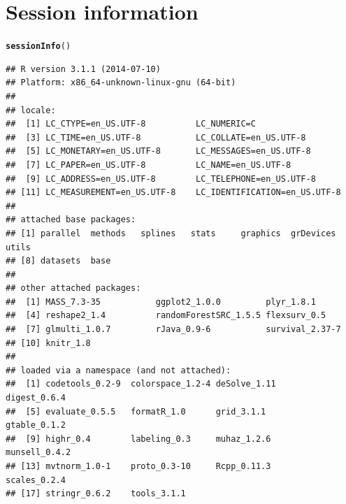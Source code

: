\documentclass{article}\usepackage[]{graphicx}\usepackage[]{color}
\makeatletter
\newcommand{\hlstd}[1]{\textcolor[rgb]{0.345,0.345,0.345}{#1}}%
\newcommand{\hlkwd}[1]{\textcolor[rgb]{0.737,0.353,0.396}{\textbf{#1}}}%
\newenvironment{kframe}{%
 \def\at@end@of@kframe{}%
 \ifinner\ifhmode%
  \def\at@end@of@kframe{\end{minipage}}%
  \begin{minipage}{\columnwidth}%
 \fi\fi%
 \def\FrameCommand##1{\hskip\@totalleftmargin \hskip-\fboxsep
 \colorbox{shadecolor}{##1}\hskip-\fboxsep
     \hskip-\linewidth \hskip-\@totalleftmargin \hskip\columnwidth}%
 \MakeFramed {\advance\hsize-\width
   \@totalleftmargin\z@ \linewidth\hsize
   \@setminipage}}%
 {\par\unskip\endMakeFramed%
 \at@end@of@kframe}
\newenvironment{knitrout}{}{} %
\makeatother
\begin{document}
\section{Session information}
\begin{knitrout}
\color{fgcolor}\begin{kframe}
\begin{alltt}
\hlkwd{sessionInfo}\hlstd{()}
\end{alltt}
\begin{verbatim}
## R version 3.1.1 (2014-07-10)
## Platform: x86_64-unknown-linux-gnu (64-bit)
## 
## locale:
##  [1] LC_CTYPE=en_US.UTF-8          LC_NUMERIC=C                 
##  [3] LC_TIME=en_US.UTF-8           LC_COLLATE=en_US.UTF-8       
##  [5] LC_MONETARY=en_US.UTF-8       LC_MESSAGES=en_US.UTF-8      
##  [7] LC_PAPER=en_US.UTF-8          LC_NAME=en_US.UTF-8          
##  [9] LC_ADDRESS=en_US.UTF-8        LC_TELEPHONE=en_US.UTF-8     
## [11] LC_MEASUREMENT=en_US.UTF-8    LC_IDENTIFICATION=en_US.UTF-8
## 
## attached base packages:
## [1] parallel  methods   splines   stats     graphics  grDevices utils    
## [8] datasets  base     
## 
## other attached packages:
##  [1] MASS_7.3-35           ggplot2_1.0.0         plyr_1.8.1           
##  [4] reshape2_1.4          randomForestSRC_1.5.5 flexsurv_0.5         
##  [7] glmulti_1.0.7         rJava_0.9-6           survival_2.37-7      
## [10] knitr_1.8            
## 
## loaded via a namespace (and not attached):
##  [1] codetools_0.2-9  colorspace_1.2-4 deSolve_1.11     digest_0.6.4    
##  [5] evaluate_0.5.5   formatR_1.0      grid_3.1.1       gtable_0.1.2    
##  [9] highr_0.4        labeling_0.3     muhaz_1.2.6      munsell_0.4.2   
## [13] mvtnorm_1.0-1    proto_0.3-10     Rcpp_0.11.3      scales_0.2.4    
## [17] stringr_0.6.2    tools_3.1.1
\end{verbatim}
\end{kframe}
\end{knitrout}
\end{document}
